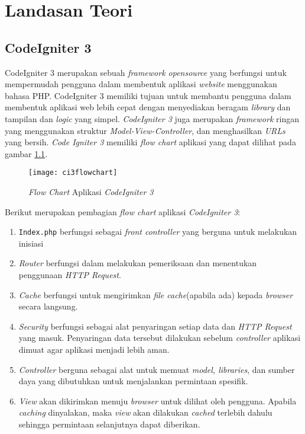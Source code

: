 \chapter{Landasan Teori}
\label{chap:teori}

\section{CodeIgniter 3\cite{ci3:22}}
\label{sec:ci3} 
 
CodeIgniter 3 merupakan sebuah \textit{framework opensource} yang berfungsi untuk mempermudah pengguna dalam membentuk aplikasi \textit{website} menggunakan bahasa PHP. CodeIgniter 3 memiliki tujuan untuk membantu pengguna dalam membentuk aplikasi web lebih cepat dengan menyediakan beragam \textit{library} dan tampilan dan \textit{logic} yang simpel. \textit{CodeIgniter 3} juga merupakan \textit{framework} ringan yang menggunakan struktur \textit{Model-View-Controller}, dan menghasilkan \textit{URLs} yang bersih. \textit{Code Igniter 3} memiliki \textit{flow chart} aplikasi yang dapat dilihat pada gambar \ref{fig:ci3flowchart}.

\begin{figure}[H]
	\centering  
	\texttt{[image: ci3flowchart]}  
	\caption[\textit{Flow Chart} Aplikasi \textit{CodeIgniter 3}]{\textit{Flow Chart} Aplikasi \textit{CodeIgniter 3}} 
	\label{fig:ci3flowchart} 
\end{figure} 

Berikut merupakan pembagian \textit{flow chart} aplikasi \textit{CodeIgniter 3}:
\begin{enumerate}
\item \texttt{Index.php} berfungsi sebagai \textit{front controller} yang berguna untuk melakukan inisiasi
\item \textit{Router} berfungsi dalam melakukan pemeriksaan dan menentukan penggunaan \textit{HTTP Request}.
\item \textit{Cache} berfungsi untuk mengirimkan \textit{file cache}(apabila ada) kepada \textit{browser} secara langsung.   
\item \textit{Security} berfungsi sebagai alat penyaringan setiap data dan \textit{HTTP Request} yang masuk. Penyaringan data tersebut dilakukan sebelum \textit{controller} aplikasi dimuat agar aplikasi menjadi lebih aman.
\item \textit{Controller} berguna sebagai alat untuk memuat \textit{model, libraries}, dan sumber daya yang dibutuhkan untuk menjalankan permintaan spesifik.
\item \textit{View} akan dikirimkan menuju \textit{browser} untuk dilihat oleh pengguna. Apabila \textit{caching} dinyalakan, maka \textit{view} akan dilakukan \textit{cached} terlebih dahulu sehingga permintaan selanjutnya dapat diberikan.
\end{enumerate}

